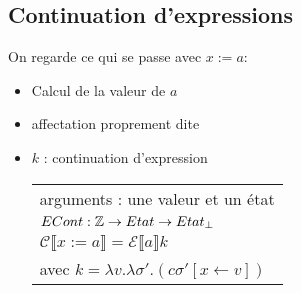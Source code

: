 \documentclass[10pt,a4paper]{article}
\newcommand{\semm}[1]{\llbracket #1 \rrbracket }
\begin{document}
\subsection{Continuation d'expressions}
On regarde ce qui se passe avec $x:=a$:
\begin{itemize}
 \item Calcul de la valeur de $a$
 \item affectation proprement dite
 \item $k$ : continuation d'expression \begin{tabular}{l}
                                        arguments : une valeur et un état \\
					$ECont : \mathbb{Z} \rightarrow Etat \rightarrow Etat_{\perp}$\\
					$\mathcal{C}\semm{x:=a} = \mathcal{E}\semm{a} k$\\
					avec $k = \lambda v. \lambda \sigma' . (c \sigma'[x\leftarrow v])$
                                       \end{tabular}

\end{itemize}
\end{document}
